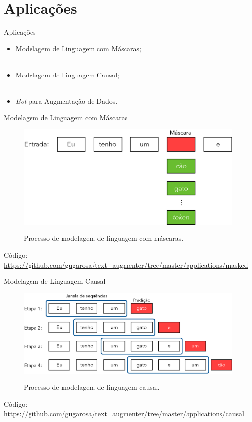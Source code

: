 \section{Aplicações}
\label{s.application}

\begin{frame}{Aplicações}
	\begin{itemize}
		\justifying
		\item Modelagem de Linguagem com Máscaras;
		\\~\\
		\item Modelagem de Linguagem Causal;	
		\\~\\
		\item \emph{Bot} para Augmentação de Dados.
	\end{itemize}
\end{frame}

\begin{frame}{Modelagem de Linguagem com Máscaras}
	\begin{figure}[!ht]
		\centering
		\includegraphics[scale=0.45]{figs/masked_lm.eps}	
		\label{f.masked_lm}
		\caption{Processo de modelagem de linguagem com máscaras.}
	\end{figure}
	Código: \url{https://github.com/gugarosa/text_augmenter/tree/master/applications/masked}
\end{frame}

\begin{frame}{Modelagem de Linguagem Causal}	
	\begin{figure}[!ht]
		\centering
		\includegraphics[scale=0.425]{figs/text_generation.eps}	
		\label{f.causal_lm}
		\caption{Processo de modelagem de linguagem causal.}
	\end{figure}
	Código: \url{https://github.com/gugarosa/text_augmenter/tree/master/applications/causal}
\end{frame}

